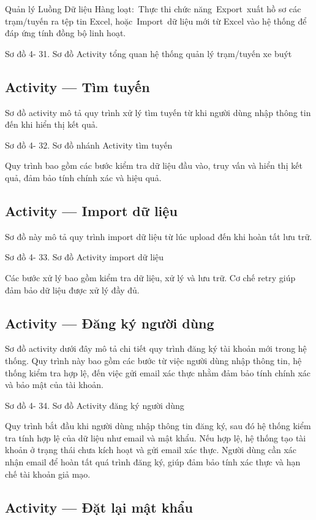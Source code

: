 \documentclass[13pt,a4paper]{report}
\begin{document}
Quản lý Luồng Dữ liệu Hàng loạt: Thực thi chức năng Export xuất hồ sơ các trạm/tuyến ra tệp tin Excel, hoặc Import dữ liệu mới từ Excel vào hệ thống để đáp ứng tính đồng bộ linh hoạt.

Sơ đồ 4- 31. Sơ đồ Activity tổng quan hệ thống quản lý trạm/tuyến xe buýt

\subsection{Activity — Tìm tuyến}

Sơ đồ activity mô tả quy trình xử lý tìm tuyến từ khi người dùng nhập thông tin đến khi hiển thị kết quả.

Sơ đồ 4- 32. Sơ đồ nhánh  Activity tìm tuyến

Quy trình bao gồm các bước kiểm tra dữ liệu đầu vào, truy vấn và hiển thị kết quả, đảm bảo tính chính xác và hiệu quả.

\subsection{Activity — Import dữ liệu}

Sơ đồ này mô tả quy trình import dữ liệu từ lúc upload đến khi hoàn tất lưu trữ.

Sơ đồ 4- 33. Sơ đồ Activity import dữ liệu

Các bước xử lý bao gồm kiểm tra dữ liệu, xử lý và lưu trữ. Cơ chế retry giúp đảm bảo dữ liệu được xử lý đầy đủ.

\subsection{Activity — Đăng ký người dùng}

Sơ đồ activity dưới đây mô tả chi tiết quy trình đăng ký tài khoản mới trong hệ thống. Quy trình này bao gồm các bước từ việc người dùng nhập thông tin, hệ thống kiểm tra hợp lệ, đến việc gửi email xác thực nhằm đảm bảo tính chính xác và bảo mật của tài khoản.

Sơ đồ 4- 34. Sơ đồ Activity đăng ký người dùng

Quy trình bắt đầu khi người dùng nhập thông tin đăng ký, sau đó hệ thống kiểm tra tính hợp lệ của dữ liệu như email và mật khẩu. Nếu hợp lệ, hệ thống tạo tài khoản ở trạng thái chưa kích hoạt và gửi email xác thực. Người dùng cần xác nhận email để hoàn tất quá trình đăng ký, giúp đảm bảo tính xác thực và hạn chế tài khoản giả mạo.

\subsection{Activity — Đặt lại mật khẩu}
\end{document}
